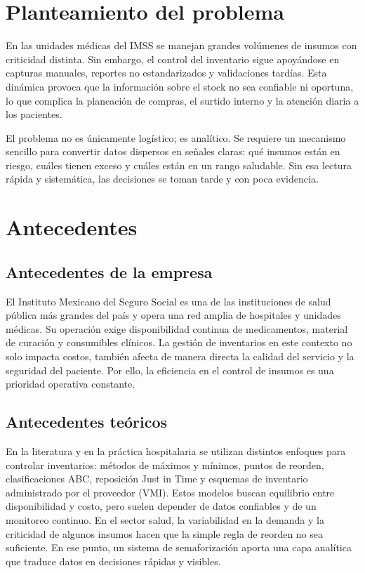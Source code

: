\section{Planteamiento del problema}
\label{sec:problema}

En las unidades médicas del IMSS se manejan grandes volúmenes de insumos con criticidad distinta. Sin embargo, el control del inventario sigue apoyándose en capturas manuales, reportes no estandarizados y validaciones tardías. Esta dinámica provoca que la información sobre el stock no sea confiable ni oportuna, lo que complica la planeación de compras, el surtido interno y la atención diaria a los pacientes.

El problema no es únicamente logístico; es analítico. Se requiere un mecanismo sencillo para convertir datos dispersos en señales claras: qué insumos están en riesgo, cuáles tienen exceso y cuáles están en un rango saludable. Sin esa lectura rápida y sistemática, las decisiones se toman tarde y con poca evidencia.

\section{Antecedentes}
\label{sec:antecedentes}

\subsection{Antecedentes de la empresa}
\label{subsec:antecedentes_empresa}

El Instituto Mexicano del Seguro Social es una de las instituciones de salud pública más grandes del país y opera una red amplia de hospitales y unidades médicas. Su operación exige disponibilidad continua de medicamentos, material de curación y consumibles clínicos. La gestión de inventarios en este contexto no solo impacta costos, también afecta de manera directa la calidad del servicio y la seguridad del paciente. Por ello, la eficiencia en el control de insumos es una prioridad operativa constante.

\subsection{Antecedentes teóricos}
\label{subsec:antecedentes_teoricos}

En la literatura y en la práctica hospitalaria se utilizan distintos enfoques para controlar inventarios: métodos de máximos y mínimos, puntos de reorden, clasificaciones ABC, reposición Just in Time y esquemas de inventario administrado por el proveedor (VMI). Estos modelos buscan equilibrio entre disponibilidad y costo, pero suelen depender de datos confiables y de un monitoreo continuo. En el sector salud, la variabilidad en la demanda y la criticidad de algunos insumos hacen que la simple regla de reorden no sea suficiente. En ese punto, un sistema de semaforización aporta una capa analítica que traduce datos en decisiones rápidas y visibles.

